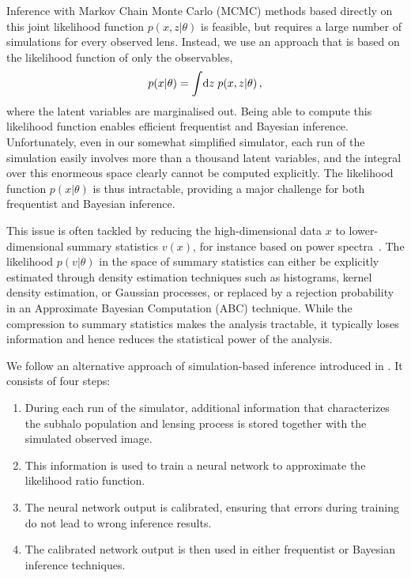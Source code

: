 \documentclass[twocolumn]{aastex62}
\begin{document}
Inference with Markov Chain Monte Carlo (MCMC) methods based directly on this joint likelihood function $p(x,z | \theta)$ is feasible, but requires a large number of simulations for every observed lens. Instead, we use an approach that is based on the likelihood function of only the observables,
%
\begin{equation}
 p(x|\theta) = \int\!\diff z \; p(x, z|\theta) \,,
 \label{eq:likelihood_latent}
\end{equation}
%
where the latent variables are marginalised out. Being able to compute this likelihood function enables efficient frequentist and Bayesian inference. Unfortunately, even in our somewhat simplified simulator, each run of the simulation easily involves more than a thousand latent variables, and the integral over this enormeous space clearly cannot be computed explicitly. The likelihood function $p(x | \theta)$ is thus intractable, providing a major challenge for both frequentist and Bayesian inference.

This issue is often tackled by reducing the high-dimensional data $x$ to lower-dimensional summary statistics $v(x)$, for instance based on power spectra~\citep{1403.2720,1809.00004,1707.04590,1806.07897,1808.03501,1710.03075,1506.01724}. The likelihood $p(v|\theta)$ in the space of summary statistics can either be explicitly estimated through density estimation techniques such as histograms, kernel density estimation, or Gaussian processes, or replaced by a rejection probability in an Approximate Bayesian Computation (ABC) technique. While the compression to summary statistics makes the analysis tractable, it typically loses information and hence reduces the statistical power of the analysis.

We follow an alternative approach of simulation-based inference introduced in \cite{1805.00013,1805.00020,1805.12244}. It consists of four steps:
%
\begin{enumerate}
  \item During each run of the simulator, additional information that characterizes the subhalo population and lensing process is stored together with the simulated observed image.
  \item This information is used to train a neural network to approximate the likelihood ratio function.
  \item The neural network output is calibrated, ensuring that errors during training do not lead to wrong inference results.
  \item The calibrated network output is then used in either frequentist or Bayesian inference techniques.
\end{enumerate}
\end{document}
